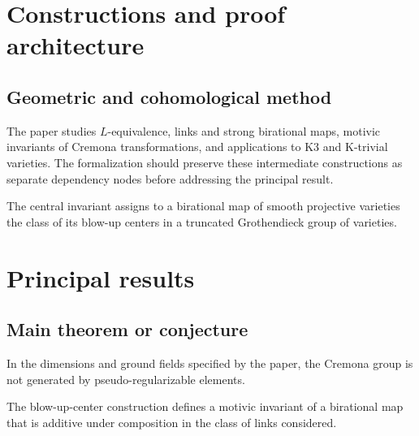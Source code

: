 \chapter{Constructions and proof architecture}
\label{chap:motivic-invariants-birational-maps-method}

\section{Geometric and cohomological method}
\label{sec:motivic-invariants-birational-maps-method}

The paper studies $L$-equivalence, links and strong birational maps, motivic invariants of Cremona transformations, and applications to K3 and K-trivial varieties. The formalization should preserve these intermediate constructions
as separate dependency nodes before addressing the principal result.

\begin{definition}
\label{motivic-invariants-birational-maps-central-object}
The central invariant assigns to a birational map of smooth projective varieties the class of its blow-up centers in a truncated Grothendieck group of varieties.
\notready
\end{definition}

\chapter{Principal results}
\label{chap:motivic-invariants-birational-maps-results}

\section{Main theorem or conjecture}
\label{sec:motivic-invariants-birational-maps-results}

\begin{theorem}
\label{motivic-invariants-birational-maps-main}
In the dimensions and ground fields specified by the paper, the Cremona group is not generated by pseudo-regularizable elements.
\notready
\end{theorem}

\begin{theorem}
\label{motivic-invariants-birational-maps-secondary}
The blow-up-center construction defines a motivic invariant of a birational map that is additive under composition in the class of links considered.
\notready
\end{theorem}
